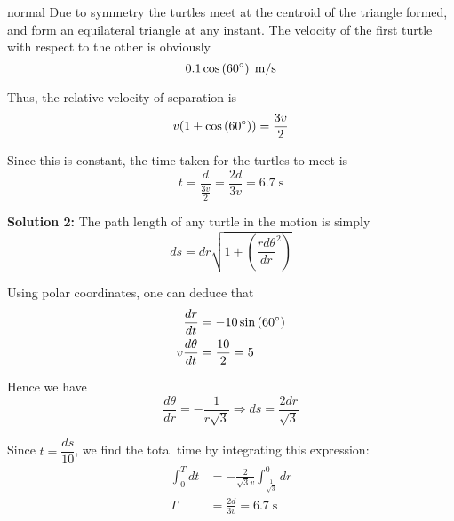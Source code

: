 \begin{solution}{normal}
Due to symmetry the turtles meet at the centroid of the triangle formed, and form an equilateral triangle at any instant. The velocity of the first turtle with respect to the other is obviously $$0.1 \cos\left(60\degree\right) \;\text{m/s}$$

Thus, the relative velocity of separation is
$$v(1+\cos\left(60\degree\right)) = \frac{3v}{2}$$

Since this is constant, the time taken for the turtles to meet is
$$t = \frac{d}{\tfrac{3v}{2}} = \frac{2d}{3v} = \boxed{6.7\;\text{s}}$$

\tcbline

\textbf{Solution 2:} The path length of any turtle in the motion is simply
$$ds = dr\sqrt{1+\left(\frac{rd\theta}{dr}^2\right)}$$

Using polar coordinates, one can deduce that
\begin{align*}
\frac{dr}{dt} &= -10\sin\left(60\degree\right)\\
v\frac{d\theta}{dt} &= \frac{10}{2}=5
\end{align*}

Hence we have
$$\frac{d\theta}{dr} = -\frac{1}{r\sqrt{3}} \Rightarrow ds = \frac{2dr}{\sqrt{3}}$$

Since $t = \dfrac{ds}{10} $, we find the total time by integrating this expression:
\begin{align*}
\int_{0}^{T}{dt} &= -\frac{2}{\sqrt{3}v}\int_{\frac{1}{\sqrt{3}}}^{0}{dr}\\
T &=  \frac{2d}{3v} = \boxed{6.7\;\text{s}}
\end{align*}
\end{solution}